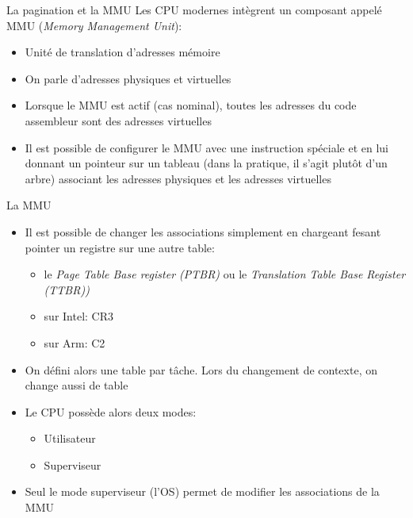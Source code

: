 \begin{frame}{La pagination et la MMU}
  Les CPU  modernes intègrent  un composant appelé  MMU (\emph{Memory
    Management Unit}):
  \begin{itemize}
  \item  Unité de translation d'adresses mémoire
  \item  On parle d'adresses physiques et virtuelles
  \item Lorsque le  MMU est actif (cas nominal),  toutes les adresses
    du code assembleur sont des adresses virtuelles
  \item  Il est  possible de  configurer le  MMU avec  une instruction
    spéciale et  en lui  donnant un pointeur  sur un tableau  (dans la
    pratique,  il s'agit  plutôt d'un  arbre) associant  les adresses
    physiques et les adresses virtuelles
  \end{itemize}
\end{frame}


\begin{frame}{La MMU}
  \begin{itemize}
  \item  Il est  possible de  changer les  associations  simplement en
    chargeant fesant pointer un registre sur une autre table:
    \begin{itemize}
    \item   le  \emph{Page   Table   Base  register   (PTBR)}  ou   le
      \emph{Translation Table Base Register (TTBR))}
    \item sur Intel: CR3
    \item  sur Arm: C2
    \end{itemize}
  \item On  défini alors une table  par tâche.  Lors  du changement de
    contexte, on change aussi de table
  \item Le CPU possède alors deux modes:
    \begin{itemize}
    \item  Utilisateur
    \item  Superviseur
    \end{itemize}
  \item  Seul  le  mode  superviseur  (l'OS) permet  de  modifier  les
    associations de la MMU
  \end{itemize}
\end{frame}

